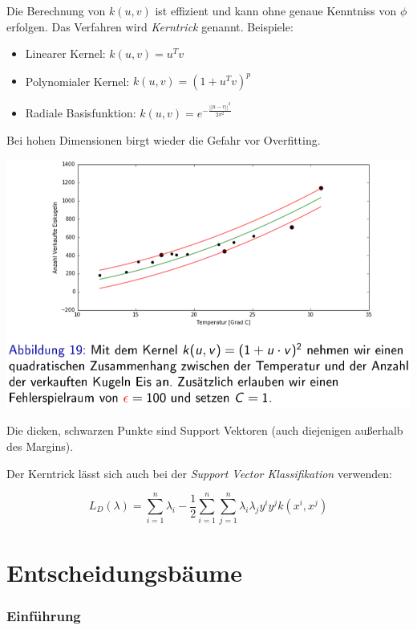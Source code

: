 \documentclass{report}
\begin{document}
Die Berechnung von $k(u, v)$ ist effizient und kann ohne genaue Kenntniss von $\phi$ erfolgen.
Das Verfahren wird \textit{Kerntrick} genannt. Beispiele:\\
\vspace*{-1.5em}
\begin{itemize}
  \item Linearer Kernel: $k(u, v) = u^Tv$
  \item Polynomialer Kernel: $k(u, v) = (1 + u^Tv)^p$
  \item Radiale Basisfunktion: $k(u, v) = e^{-\frac{||u-v||^2}{2\sigma^2}}$
\end{itemize}

Bei hohen Dimensionen birgt wieder die Gefahr vor Overfitting.

\begin{center}
  \includegraphics[scale=.295]{ml06_19}
\end{center}

Die dicken, schwarzen Punkte sind Support Vektoren (auch diejenigen außerhalb des Margins).

Der Kerntrick lässt sich auch bei der \textit{Support Vector Klassifikation} verwenden:

$$L_D(\lambda) = \sum_{i=1}^n\lambda_i - \frac{1}{2}\sum_{i=1}^n\sum_{j=1}^n\lambda_i\lambda_jy^iy^jk(x^i, x^j)$$

\chapter{Entscheidungsbäume}

\subsection{Einführung}
\end{document}
